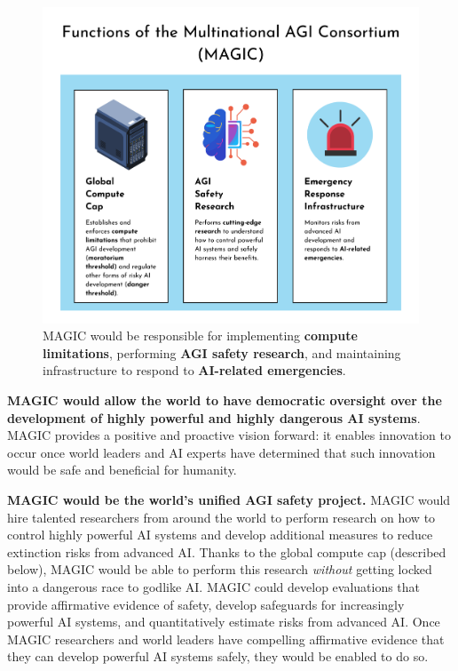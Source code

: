 \documentclass[12pt,a4paper]{article}
\begin{document}
\begin{figure}[h]
    \centering
    \includegraphics[width=1\linewidth]{figure1.png}
    \caption{MAGIC would be responsible for implementing \textbf{compute limitations}, performing \textbf{AGI safety research}, and maintaining infrastructure to respond to \textbf{AI-related emergencies}.}
    \label{fig:enter-label}
\end{figure}

\textbf{MAGIC would allow the world to have democratic oversight over the development of highly powerful and highly dangerous AI systems}. MAGIC provides a positive and proactive vision forward: it enables innovation to occur once world leaders and AI experts have determined that such innovation would be safe and beneficial for humanity. 

\textbf{MAGIC would be the world’s unified AGI safety project. }MAGIC would hire talented researchers from around the world to perform research on how to control highly powerful AI systems and develop additional measures to reduce extinction risks from advanced AI. Thanks to the global compute cap (described below), MAGIC would be able to perform this research \textit{without} getting locked into a dangerous race to godlike AI. MAGIC could develop evaluations that provide affirmative evidence of safety, develop safeguards for increasingly powerful AI systems, and quantitatively estimate risks from advanced AI. Once MAGIC researchers and world leaders have compelling affirmative evidence that they can develop powerful AI systems safely, they would be enabled to do so.
\end{document}
